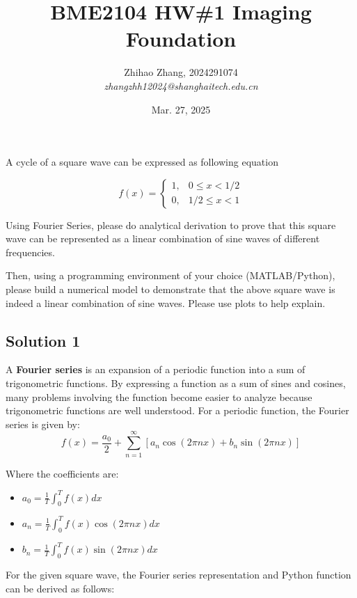 \documentclass[12pt, a4paper, oneside]{ctexart}
\begin{document}
\title{BME2104 HW\#1\textbf{
		Imaging Foundation}}

\author{Zhihao Zhang, 2024291074\\ \textit{zhangzhh12024@shanghaitech.edu.cn}}
\date{Mar. 27, 2025}
\maketitle

\begin{problem}

A cycle of a square wave can be expressed as following equation

\[f(x)=\left\{\begin{array}{cc}1,&0\leq x<1/2\\0,&1/2\leq x<1\end{array}\right.\]

Using Fourier Series, please do analytical derivation to prove that this square wave can be represented as a linear combination of sine waves of different frequencies.

Then, using a programming environment of your choice (MATLAB/Python), please build a numerical model to demonstrate that the above square wave is indeed a linear combination of sine waves. Please use plots to help explain.

\end{problem}
\subsection*{Solution 1}
A \textbf{Fourier series} is an expansion of a periodic function into a sum of trigonometric functions. By expressing a function as a sum of sines and cosines, many problems involving the function become easier to analyze because trigonometric functions are well understood. 
For a periodic function, the Fourier series is given by:
\[f(x) = \frac{a_0}{2} + \sum_{n=1}^{\infty} [a_n \cos(2\pi n x) + b_n \sin(2\pi n x)]\]

Where the coefficients are:
\begin{itemize}
	\item $\displaystyle a_0  = \frac{1}{T}\int_0^T f(x)dx$
	\item $\displaystyle a_n  = \frac{1}{T}\int_0^T f(x)\cos(2\pi n x)dx$
	\item$\displaystyle b_n  = \frac{1}{T}\int_0^T f(x)\sin(2\pi n x)dx$
\end{itemize}

For the given square wave, the Fourier series representation and Python function can be derived as follows:
\end{document}
